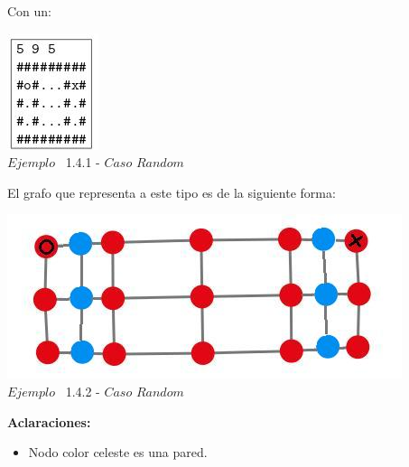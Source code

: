  Con un:
 
\vspace*{0.3cm} \vspace*{0.3cm}
  \begin{center}
 \includegraphics[scale=0.65]{./EJ1/ej1random.jpeg}
\\ {$Ejemplo$ \ 1.4.1 - $Caso$ $Random$}
  \end{center}
  \vspace*{0.3cm}

El grafo que representa a este tipo es de la siguiente forma:\\

\vspace*{0.3cm} \vspace*{0.3cm}
  \begin{center}
 \includegraphics[scale=0.5]{./EJ1/ej1graforandom.jpeg}
 \\{$Ejemplo$ \ 1.4.2 - $Caso$ $Random$}
  \end{center}
  \vspace*{0.3cm}



\textbf{Aclaraciones:} 
\begin{itemize}
\item Nodo color celeste es una pared.
\end{itemize}
